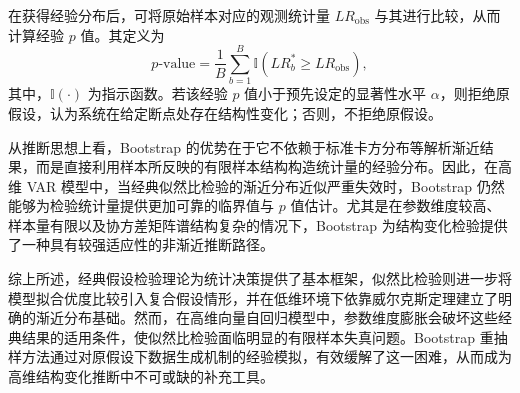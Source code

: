 \documentclass[UTF8,a4paper,12pt]{ctexbook}
\begin{document}
在获得经验分布后，可将原始样本对应的观测统计量 $LR_{\mathrm{obs}}$ 与其进行比较，从而计算经验 $p$ 值。其定义为
\begin{equation}
p\text{-value}=\frac{1}{B}\sum_{b=1}^{B}\mathbb{I}(LR_b^*\geq LR_{\mathrm{obs}}),
\end{equation}
其中，$\mathbb{I}(\cdot)$ 为指示函数。若该经验 $p$ 值小于预先设定的显著性水平 $\alpha$，则拒绝原假设，认为系统在给定断点处存在结构性变化；否则，不拒绝原假设。

从推断思想上看，Bootstrap 的优势在于它不依赖于标准卡方分布等解析渐近结果，而是直接利用样本所反映的有限样本结构构造统计量的经验分布。因此，在高维 VAR 模型中，当经典似然比检验的渐近分布近似严重失效时，Bootstrap 仍然能够为检验统计量提供更加可靠的临界值与 $p$ 值估计。尤其是在参数维度较高、样本量有限以及协方差矩阵谱结构复杂的情况下，Bootstrap 为结构变化检验提供了一种具有较强适应性的非渐近推断路径。

综上所述，经典假设检验理论为统计决策提供了基本框架，似然比检验则进一步将模型拟合优度比较引入复合假设情形，并在低维环境下依靠威尔克斯定理建立了明确的渐近分布基础。然而，在高维向量自回归模型中，参数维度膨胀会破坏这些经典结果的适用条件，使似然比检验面临明显的有限样本失真问题。Bootstrap 重抽样方法通过对原假设下数据生成机制的经验模拟，有效缓解了这一困难，从而成为高维结构变化推断中不可或缺的补充工具。
\end{document}
